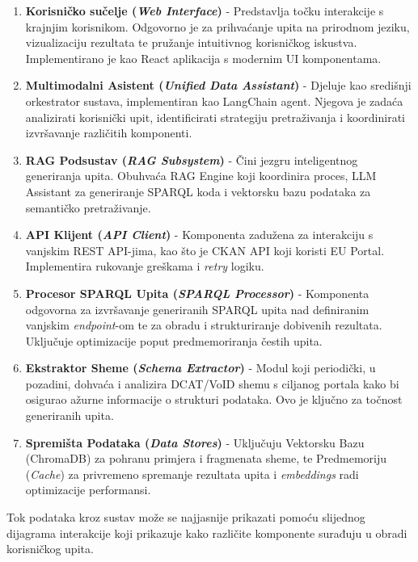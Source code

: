 \begin{enumerate}
    \item \textbf{Korisničko sučelje (\textit{Web Interface})} - Predstavlja točku interakcije s krajnjim korisnikom. Odgovorno je za prihvaćanje upita na prirodnom jeziku, vizualizaciju rezultata te pružanje intuitivnog korisničkog iskustva. Implementirano je kao React aplikacija s modernim UI komponentama.
    
    \item \textbf{Multimodalni Asistent (\textit{Unified Data Assistant})} - Djeluje kao središnji orkestrator sustava, implementiran kao LangChain agent. Njegova je zadaća analizirati korisnički upit, identificirati strategiju pretraživanja i koordinirati izvršavanje različitih komponenti.
    
    \item \textbf{RAG Podsustav (\textit{RAG Subsystem})} - Čini jezgru inteligentnog generiranja upita. Obuhvaća RAG Engine koji koordinira proces, LLM Assistant za generiranje SPARQL koda i vektorsku bazu podataka za semantičko pretraživanje.
    
    \item \textbf{API Klijent (\textit{API Client})} - Komponenta zadužena za interakciju s vanjskim REST API-jima, kao što je CKAN API koji koristi EU Portal. Implementira rukovanje greškama i \textit{retry} logiku.
    
    \item \textbf{Procesor SPARQL Upita (\textit{SPARQL Processor})} - Komponenta odgovorna za izvršavanje generiranih SPARQL upita nad definiranim vanjskim \textit{endpoint}-om te za obradu i strukturiranje dobivenih rezultata. Uključuje optimizacije poput predmemoriranja čestih upita.
    
    \item \textbf{Ekstraktor Sheme (\textit{Schema Extractor})} - Modul koji periodički, u pozadini, dohvaća i analizira DCAT/VoID shemu s ciljanog portala kako bi osigurao ažurne informacije o strukturi podataka. Ovo je ključno za točnost generiranih upita.
    
    \item \textbf{Spremišta Podataka (\textit{Data Stores})} - Uključuju Vektorsku Bazu (ChromaDB) za pohranu primjera i fragmenata sheme, te Predmemoriju (\textit{Cache}) za privremeno spremanje rezultata upita i \textit{embeddings} radi optimizacije performansi.
\end{enumerate}

Tok podataka kroz sustav može se najjasnije prikazati pomoću slijednog dijagrama interakcije koji prikazuje kako različite komponente surađuju u obradi korisničkog upita.

